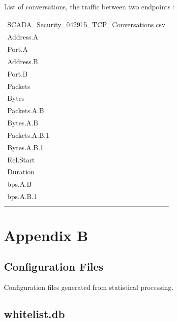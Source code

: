 \documentclass[12pt,]{article}
\begin{document}
List of conversations, the traffic between two endpoints :

\begin{longtable}[c]{@{}l@{}}
\toprule\addlinespace
SCADA\_Security\_042915\_TCP\_Conversations.csv
\\\addlinespace
\midrule\endhead
Address.A
\\\addlinespace
Port.A
\\\addlinespace
Address.B
\\\addlinespace
Port.B
\\\addlinespace
Packets
\\\addlinespace
Bytes
\\\addlinespace
Packets.A.B
\\\addlinespace
Bytes.A.B
\\\addlinespace
Packets.A.B.1
\\\addlinespace
Bytes.A.B.1
\\\addlinespace
Rel.Start
\\\addlinespace
Duration
\\\addlinespace
bps.A.B
\\\addlinespace
bps.A.B.1
\\\addlinespace
\bottomrule
\end{longtable}

\pagebreak

\section*{Appendix B}\label{appendix-b}

\subsection*{Configuration Files}\label{configuration-files}

Configuration files generated from statistical processing.

\subsection{whitelist.db}\label{whitelist.db}
\end{document}
